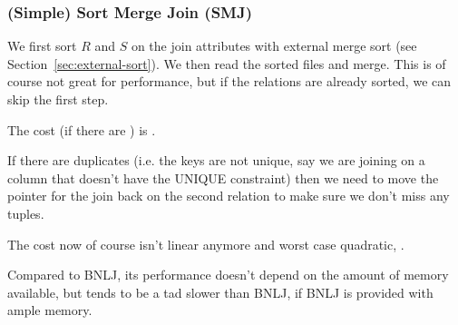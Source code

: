 \subsubsection{(Simple) Sort Merge Join (SMJ)}
We first sort $R$ and $S$ on the join attributes with external merge sort (see Section~\ref{sec:external-sort}). We then read the sorted files and merge.
This is of course not great for performance, but if the relations are already sorted, we can skip the first step.

The cost (if there are ) is .

If there are duplicates (i.e. the keys are not unique, say we are joining on a column that doesn't have the UNIQUE constraint)
then we need to move the pointer for the join back on the second relation to make sure we don't miss any tuples.

The cost now of course isn't linear anymore and worst case quadratic, .

Compared to BNLJ, its performance doesn't depend on the amount of memory available, but tends to be a tad slower than BNLJ, if BNLJ is provided with ample memory.
